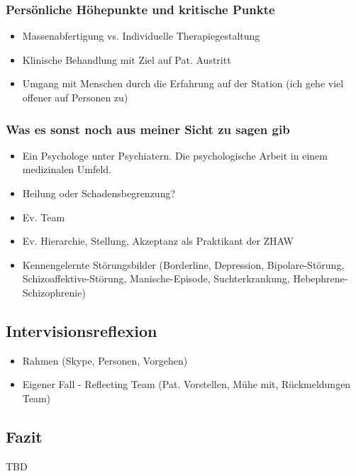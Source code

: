 \documentclass[jou,apacite]{apa6}
\begin{document}
\subsubsection{Persönliche Höhepunkte und kritische Punkte} \label{sec:Höhepunkte}
\begin{itemize}
        \item Massenabfertigung vs. Individuelle Therapiegestaltung
        \item Klinische Behandlung mit Ziel auf Pat. Austritt
        \item Umgang mit Menschen durch die Erfahrung auf der Station (ich gehe viel offener auf Personen zu)
\end{itemize}
    
    
\subsubsection{Was es sonst noch aus meiner Sicht zu sagen gib}
\begin{itemize}
    \item Ein Psychologe unter Psychiatern. Die psychologische Arbeit in einem medizinalen Umfeld.
    \item Heilung oder Schadensbegrenzung?
    \item Ev. Team
    \item Ev. Hierarchie, Stellung, Akzeptanz als Praktikant der ZHAW
    \item Kennengelernte Störungsbilder (Borderline, Depression, Bipolare-Störung, Schizoaffektive-Störung, Manische-Episode, Suchterkrankung, Hebephrene-Schizophrenie)
\end{itemize}

\subsection{Intervisionsreflexion} \label{sec:Intervision}
\begin{itemize}
    \item Rahmen (Skype, Personen, Vorgehen)
    \item Eigener Fall - Reflecting Team (Pat. Vorstellen, Mühe mit, Rückmeldungen Team)
\end{itemize}

\subsection{Fazit}
TBD

\begin{flushleft}
\nocite{*}
{}
\end{flushleft}
\end{document}
